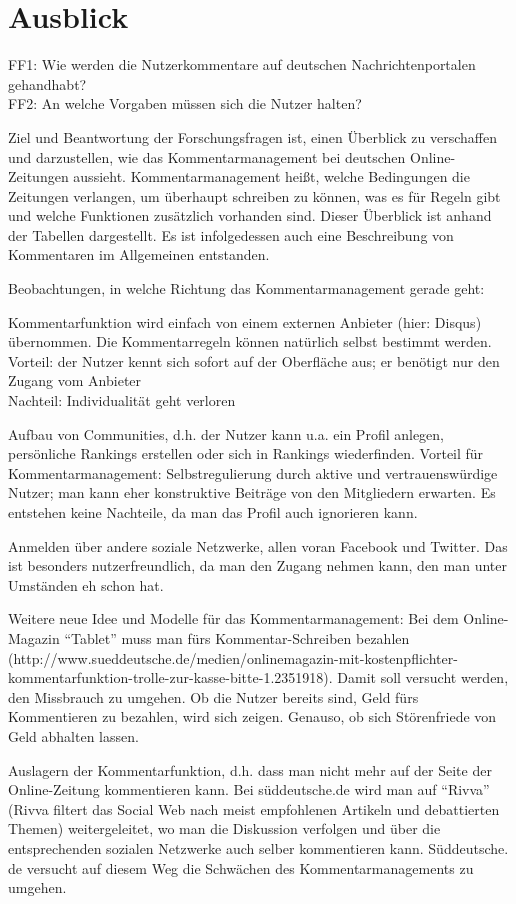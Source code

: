 \chapter{Ausblick}

FF1: Wie werden die Nutzerkommentare auf deutschen Nachrichtenportalen
gehandhabt?\\
FF2: An welche Vorgaben müssen sich die Nutzer halten?

Ziel und Beantwortung der Forschungsfragen ist, einen Überblick zu verschaffen und darzustellen, wie das Kommentarmanagement bei deutschen Online-Zeitungen aussieht. Kommentarmanagement heißt, welche Bedingungen die Zeitungen verlangen, um überhaupt schreiben zu können, was es für Regeln gibt und welche Funktionen zusätzlich vorhanden sind. Dieser Überblick ist anhand der Tabellen dargestellt. 
Es ist infolgedessen auch eine Beschreibung von Kommentaren im Allgemeinen entstanden.



Beobachtungen, in welche Richtung das Kommentarmanagement gerade geht:

Kommentarfunktion wird einfach von einem externen Anbieter (hier: Disqus) übernommen. Die Kommentarregeln können natürlich selbst bestimmt werden. \\
Vorteil: der Nutzer kennt sich sofort auf der Oberfläche aus; er benötigt nur den Zugang vom Anbieter\\
Nachteil: Individualität geht verloren


Aufbau von Communities, d.h. der Nutzer kann u.a. ein Profil anlegen, persönliche Rankings erstellen oder sich in Rankings wiederfinden.
Vorteil für Kommentarmanagement: Selbstregulierung durch aktive und vertrauenswürdige Nutzer; man kann eher konstruktive Beiträge von den Mitgliedern erwarten. Es entstehen keine Nachteile, da man das Profil auch ignorieren kann.
 

Anmelden über andere soziale Netzwerke, allen voran Facebook und Twitter. Das ist besonders nutzerfreundlich, da man den Zugang nehmen kann, den man unter Umständen eh schon hat. 




Weitere neue Idee und Modelle für das Kommentarmanagement:
Bei dem Online-Magazin ``Tablet'' muss man fürs Kommentar-Schreiben bezahlen (http://www.sueddeutsche.de/\-me\-dien/onlinemagazin-mit-kostenpflichter-kommentarfunktion-trolle-zur-kasse-bitte-1.2351918).
Damit soll versucht werden, den Missbrauch zu umgehen. Ob die Nutzer bereits sind, Geld fürs Kommentieren zu bezahlen, wird sich zeigen. Genauso, ob sich Störenfriede von Geld abhalten lassen.


Auslagern der Kommentarfunktion, d.h. dass man nicht mehr auf der Seite der Online-Zeitung kommentieren kann. Bei süddeutsche.de wird man auf ``Rivva'' (Rivva filtert das Social Web nach meist empfohlenen Artikeln und debattierten Themen) weitergeleitet, wo man die Diskussion verfolgen und über die entsprechenden sozialen Netzwerke auch selber kommentieren kann. Süddeutsche. de versucht auf diesem Weg die Schwächen des Kommentarmanagements zu umgehen. 

